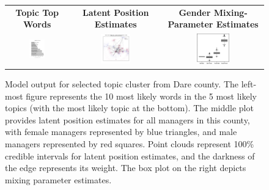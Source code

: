 \documentclass{pnastwo}
\begin{document}
\begin{article}
\begin{figure}
	\centering
	 \vspace*{-.16in}
	\begin{tabular}{ccc}
		\textbf{Topic Top Words} & \textbf{Latent Position Estimates} & \textbf{Gender Mixing-Parameter Estimates} \\
	\includegraphics[width = 0.27\textwidth]{images/Output_Dare_internal_clust_topics2.pdf} &
	\includegraphics[width = 0.35\textwidth]{images/Output_Dare_internal_Network2.pdf} &
	\includegraphics[width = 0.35\textwidth]{images/Dare_Betas_2.png}
	\end{tabular}
	
	\caption{\label{fig:dare results} Model output for selected topic cluster from Dare county. The left-most figure represents the 10 most likely words in the 5 most likely topics (with the most likely topic at the bottom). The middle plot provides latent position estimates for all managers in this county, with female managers represented by blue triangles, and male managers represented by red squares. Point clouds represent 100\% credible intervals for latent position estimates, and the darkness of the edge represents its weight. The box plot on the right depicts mixing parameter estimates.}
	

\end{figure}
\end{article}
\end{document}
